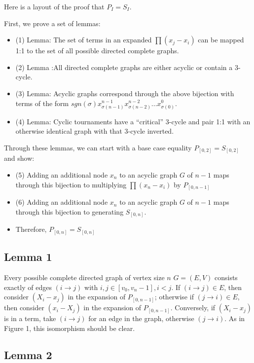 \documentclass[11pt, oneside]{article} 	%
\begin{document}
Here is a layout of the proof that $P_I=S_I$.

First, we prove a set of lemmas:
\begin{itemize}
\item (1) Lemma: The set of terms in an expanded $\prod(x_j - x_i)$ can be mapped 1:1 to the set of all possible directed complete graphs.
\item (2) Lemma :All directed complete graphs are either acyclic or contain a 3-cycle.
\item (3) Lemma: Acyclic graphs correspond through the above bijection with terms of the form $sgn(\sigma) x_{\sigma(n-1)}^{n-1} x_{\sigma(n-2)}^{n-2} ... x_{\sigma(0)}^{0}$.
\item (4) Lemma: Cyclic tournaments have a ``critical'' 3-cycle and pair 1:1 with an otherwise identical graph with that 3-cycle inverted.
\end{itemize}

Through these lemmas, we can start with a base case equality $P_{[0,2]} = S_{[0,2]}$ and show:
\begin{itemize}
\item (5) Adding an additional node $x_n$ to an acyclic graph $G$ of $n-1$ maps through this bijection to  multiplying $\prod(x_n-x_i)$ by $P_[0,n-1]$
\item (6) Adding an additional node $x_n$ to an acyclic graph $G$ of $n-1$ maps through this bijection to  generating $S_[0,n]$.
\item Therefore, $P_{[0,n]} = S_{[0,n]}$
\end{itemize}

\subsection{Lemma 1}

Every possible complete directed graph of vertex size $n$ $G = (E,V)$ consists exactly of edges $(i \rightarrow j)$ with $i, j \in [v_0, v_n-1], i < j$.  If $(i \rightarrow j) \in E$, then consider $(X_i - x_j)$ in the expansion of $P_{[0, n-1]}$; otherwise if $(j \rightarrow i) \in E$, then consider $(x_i - X_j)$ in the expansion of $P_{[0, n-1]}$.  Conversely, if $(X_i - x_j)$ is in a term, take $(i \rightarrow j)$ for an edge in the graph, otherwise $(j \rightarrow i)$.  As in Figure 1, this isomorphism should be clear.

\subsection{Lemma 2}
\end{document}
